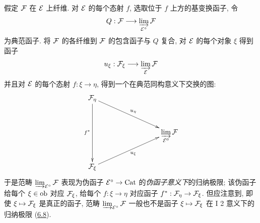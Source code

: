 \setcounter{subsection}{4}
\setcounter{subsubsection}{-1}
\subsubsection{}

假定 ${\mathcal F}$ 在 ${\mathcal E}$ 上纤维.
对 ${\mathcal E}$ 的每个态射 $f$, 选取位于 $f$ 上方的基变换函子,
令
$$
Q :\Ff \to \varinjlim_{\mathcal{E}^{\circ}} \Ff
$$
为\pageoriginale 典范函子.
将 ${\mathcal F}$ 的各纤维到 ${\mathcal F}$ 的包含函子与 $Q$ 复合,
对 ${\mathcal E}$ 的每个对象 $\xi$ 得到函子
$$
u_{\xi} : \Ff_{\xi} \to \varinjlim_{\mathcal{E}} \Ff
$$
并且对 ${\mathcal E}$ 的每个态射 $f:\xi\to\eta$,
得到一个在典范同构意义下交换的图:
\[
\xymatrix@R=1cm@C=3cm{
\Ff_{\eta} \ar[rd]^{u_{\eta}} \ar[dd]_{f^\ast}&\\
                   &\displaystyle\mathop{\varinjlim}_{\Ee^{0}}\Ff\\
\Ff_{\xi} \ar[ru]_{u_{\xi}} &
}
\]
于是范畴 $\varinjlim_{\mathcal{E}^{\circ}}{\mathcal F}$
表现为伪函子 $\Ee^{\circ}\to\Cat$ 的\emph{伪函子意义下}的归纳极限\cite{sga4.exp.VI.bib.5};
该伪函子给每个 $\xi\in\operatorname{ob}$ 对应 ${\mathcal F}_{\xi}$,
给每个 $f:\xi\to\eta$ 对应函子 $f^{\ast}:\Ff_{\eta}\to\Ff_{\xi}$.
但应注意到, 即使 $\xi\mapsto{\mathcal F}_{\xi}$ 是真正的函子,
范畴 $\varinjlim_{\mathcal{E}^{\circ}}{\mathcal F}$
一般也不是函子 $\xi\mapsto{\mathcal F}_{\xi}$ 在 I 2 意义下的归纳极限
(\cf \hyperref[VI.exe6.8]{6.8}).

